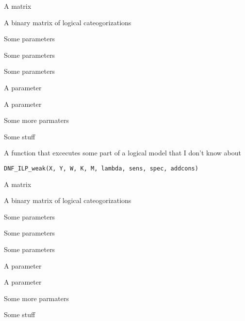 \documentclass[letterpaper]{book}
\begin{document}
\begin{Arguments}
\begin{ldescription}
\item[\code{X}] A matrix

\item[\code{Y}] A binary matrix of logical cateogorizations

\item[\code{W}] Some parameters

\item[\code{K}] Some parameters

\item[\code{M}] Some parameters

\item[\code{lambda}] A parameter

\item[\code{sens}] A parameter

\item[\code{spec}] Some more parmaters

\item[\code{addcons}] Some stuff
\end{ldescription}
\end{Arguments}
%
\begin{Description}\relax
A function that excecutes some part of a logical model that I don't know about
\end{Description}
%
\begin{Usage}
\begin{verbatim}
DNF_ILP_weak(X, Y, W, K, M, lambda, sens, spec, addcons)
\end{verbatim}
\end{Usage}
%
\begin{Arguments}
\begin{ldescription}
\item[\code{X}] A matrix

\item[\code{Y}] A binary matrix of logical cateogorizations

\item[\code{W}] Some parameters

\item[\code{K}] Some parameters

\item[\code{M}] Some parameters

\item[\code{lambda}] A parameter

\item[\code{sens}] A parameter

\item[\code{spec}] Some more parmaters

\item[\code{addcons}] Some stuff
\end{ldescription}
\end{Arguments}
\end{document}
